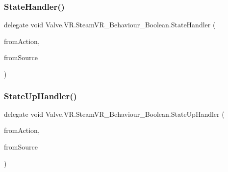 \mbox{\label{class_valve_1_1_v_r_1_1_steam_v_r___behaviour___boolean_a915c126540f6be14cd925ac1679649af}} 
\subsubsection{\texorpdfstring{StateHandler()}{StateHandler()}}
{\footnotesize\ttfamily delegate void Valve.\+V\+R.\+Steam\+V\+R\+\_\+\+Behaviour\+\_\+\+Boolean.\+State\+Handler (\begin{DoxyParamCaption}\item[{\mbox{\hyperlink{class_valve_1_1_v_r_1_1_steam_v_r___behaviour___boolean}{Steam\+V\+R\+\_\+\+Behaviour\+\_\+\+Boolean}}}]{from\+Action,  }\item[{\mbox{\hyperlink{namespace_valve_1_1_v_r_a82e5bf501cc3aa155444ee3f0662853f}{Steam\+V\+R\+\_\+\+Input\+\_\+\+Sources}}}]{from\+Source }\end{DoxyParamCaption})}

\mbox{\label{class_valve_1_1_v_r_1_1_steam_v_r___behaviour___boolean_a6ac1e6383124de89a78d25b5f453bab7}} 
\subsubsection{\texorpdfstring{StateUpHandler()}{StateUpHandler()}}
{\footnotesize\ttfamily delegate void Valve.\+V\+R.\+Steam\+V\+R\+\_\+\+Behaviour\+\_\+\+Boolean.\+State\+Up\+Handler (\begin{DoxyParamCaption}\item[{\mbox{\hyperlink{class_valve_1_1_v_r_1_1_steam_v_r___behaviour___boolean}{Steam\+V\+R\+\_\+\+Behaviour\+\_\+\+Boolean}}}]{from\+Action,  }\item[{\mbox{\hyperlink{namespace_valve_1_1_v_r_a82e5bf501cc3aa155444ee3f0662853f}{Steam\+V\+R\+\_\+\+Input\+\_\+\+Sources}}}]{from\+Source }\end{DoxyParamCaption})}

